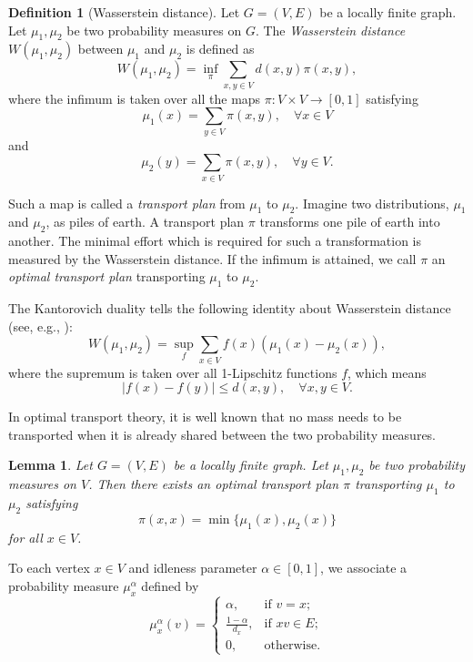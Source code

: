 \documentclass[11pt,bezier]{article}
\newtheorem{lemma}{Lemma}[section]
\theoremstyle{definition}
\newtheorem{defi}{Definition}[section]
\theoremstyle{definition}
\theoremstyle{nonumber}
\begin{document}
\begin{defi}[Wasserstein distance] 
Let $G = (V, E)$ be a locally finite graph. Let $\mu_1, \mu_2$ be two probability measures on $G$. The \textit{Wasserstein distance} $W(\mu_1, \mu_2)$ between $\mu_1$ and $\mu_2$ is defined as
$$
W(\mu_1, \mu_2) = \inf_{\pi} \sum_{x, y \in V} d(x, y) \pi(x, y),
$$
where the infimum is taken over all the maps $\pi : V \times V \to [0, 1]$ satisfying
$$
\mu_1(x) = \sum_{y \in V} \pi(x, y), \quad \forall x \in V
$$
and
$$
\mu_2(y) = \sum_{x \in V} \pi(x, y), \quad \forall y \in V.
$$
\end{defi}

Such a map is called a \textit{transport plan} from $\mu_1$ to $\mu_2$.
Imagine two distributions, $\mu_1$ and $\mu_2$, as piles of earth. A transport plan $\pi$ transforms one pile of earth into another. The minimal effort which is required for such a transformation is measured by the Wasserstein distance. If the infimum is attained, we call $\pi$ an \textit{optimal transport plan} transporting $\mu_1$ to $\mu_2$.

The Kantorovich duality tells the following identity about Wasserstein distance (see, e.g., \cite[Theorem 1.14]{Villani}):
$$
W(\mu_1, \mu_2) = \sup_f \sum_{x \in V} f(x) (\mu_1(x) - \mu_2(x)),
$$
where the supremum is taken over all 1-Lipschitz functions $f$, which means 
$$
|f(x) - f(y)| \leq d(x, y), \quad \forall x, y \in V.
$$

In optimal transport theory, it is well known that no mass needs to be transported when it is already shared between the two probability measures.

\begin{lemma}\label{simple transport plan}   
Let $G = (V, E)$ be a locally finite graph. Let $\mu_1, \mu_2$ be two probability measures on $V$. Then there exists an optimal transport plan $\pi$ transporting $\mu_1$ to $\mu_2$ satisfying
$$
\pi(x, x) = \min\{\mu_1(x), \mu_2(x)\}
$$
for all $x \in V$.
\end{lemma}

To each vertex $x \in V$ and idleness parameter $\alpha \in [0, 1]$, we associate a probability measure $\mu_x^\alpha$ defined by
$$
\mu_x^\alpha(v) =
\begin{cases} 
\alpha, & \text{if } v = x; \\ 
\frac{1-\alpha}{d_x}, & \text{if } xv \in E; \\ 
0, & \text{otherwise}.
\end{cases}
$$
\end{document}
